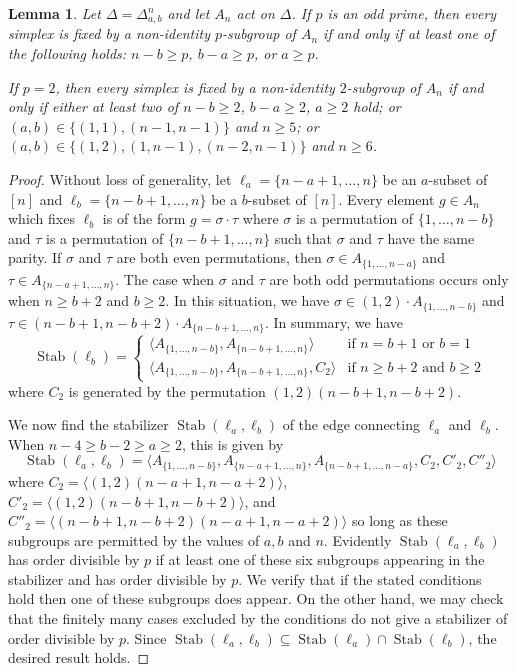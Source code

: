 \documentclass[12pt]{amsart}
\theoremstyle{plain}
\newtheorem{lemma}[theorem]{Lemma}
\theoremstyle{definition}
\theoremstyle{remark}
\numberwithin{equation}{section}
\DeclareMathOperator{\Stab}{Stab}
\begin{document}
\begin{lemma}\label{lem:an_stabsbyp}
    Let $\Delta=\Delta^n_{a,b}$ and let $A_n$ act on $\Delta$. If $p$ is an odd prime, then every simplex is fixed by a non-identity $p$-subgroup of $A_n$ if and only if at least one of the following holds: $n-b\geq p$, $b-a\geq p$, or $a\geq p$.
    
    If $p=2$, then every simplex is fixed by a non-identity $2$-subgroup of $A_n$ if and only if either at least two of $n-b\ge 2$, $b-a\ge 2$, $a\ge 2$ hold; or $(a,b)\in\{(1,1),(n-1,n-1)\}$ and $n\ge 5$; or $(a,b)\in\{(1,2), (1,n-1), (n-2,n-1)\}$ and $n\ge 6$.
\end{lemma}
\begin{proof}
Without loss of generality, let $\ell_a=\{n-a+1,\ldots,n\}$ be an $a$-subset of $[n]$ and $\ell_b=\{n-b+1,\ldots,n\}$ be a $b$-subset of $[n]$.
Every element $g\in A_n$ which fixes $\ell_b$ is of the form $g=\sigma\cdot\tau$ where $\sigma$ is a permutation of $\{1,\ldots,n-b\}$ and $\tau$ is a permutation of $\{n-b+1,\ldots,n\}$ such that $\sigma$ and $\tau$ have the same parity. If $\sigma$ and $\tau$ are both even permutations, then 
$\sigma\in A_{\{1,\ldots,n-a\}}$ and $\tau\in A_{\{n-a+1,\ldots,n\}}$. 
The case when $\sigma$ and $\tau$ are both odd permutations occurs only when $n\geq b+2$ and $b\geq2$. In this situation, we have $\sigma\in (1,2)\cdot A_{\{1,\ldots,n-b\}}$ and $\tau\in (n-b+1,n-b+2)\cdot A_{\{n-b+1,\ldots,n\}}$.  In summary, we have 
$$\Stab(\ell_b)=\begin{cases}
\langle A_{\{1,\ldots,n-b\}}, A_{\{n-b+1,\ldots,n\}}\rangle & \text{if }n=b+1 \text{ or }b=1\\
\langle A_{\{1,\ldots,n-b\}}, A_{\{n-b+1,\ldots,n\}}, C_2\rangle & \text{if }n\geq b+2\text{ and }b\geq 2\end{cases}$$
where $C_2$ is generated by the permutation $(1,2)(n-b+1,n-b+2)$.

We now find the stabilizer $\Stab(\ell_a,\ell_b)$ of the edge connecting $\ell_a$ and $\ell_b$. When $n-4\geq b-2\geq a\geq 2$, this is given by
$$\Stab(\ell_a,\ell_b)=\langle A_{\{1,\ldots,n-b\}}, A_{\{n-a+1,\ldots,n\}}, A_{\{n-b+1,\ldots,n-a\}}, C_2, C'_2, C''_2\rangle$$
where $C_2=\langle(1,2)(n-a+1,n-a+2)\rangle$, $C'_2=\langle(1,2)(n-b+1,n-b+2)\rangle$, and $C''_2=\langle(n-b+1,n-b+2)(n-a+1,n-a+2)\rangle$ so long as these subgroups are permitted by the values of $a, b$ and $n$.
Evidently $\Stab(\ell_a,\ell_b)$ has order divisible by $p$ if at least one of these six subgroups appearing in the stabilizer and has order divisible by $p$. We verify that if the stated conditions hold then one of these subgroups does appear. On the other hand, we may check that the finitely many cases excluded by the conditions do not give a stabilizer of order divisible by $p$.
Since $\Stab(\ell_a,\ell_b)\subseteq\Stab(\ell_a)\cap \Stab(\ell_b)$, the desired result holds.
\end{proof}
\end{document}
